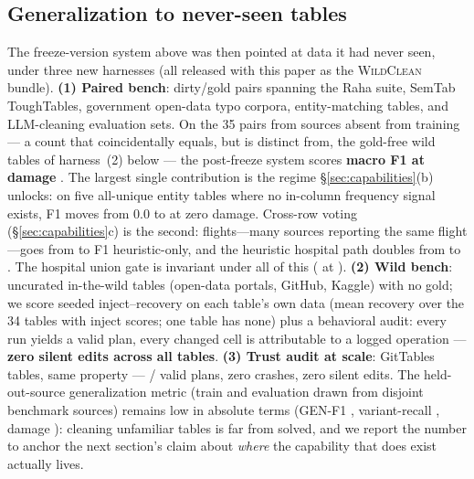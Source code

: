 \documentclass[11pt]{article}
\begin{document}
\subsection{Generalization to never-seen tables}
\label{sec:wild}
The freeze-version system above was then pointed at data it had never seen, under
three new harnesses (all released with this paper as the \textsc{WildClean} bundle).
\textbf{(1) Paired bench}: \nPairs{} dirty/gold pairs spanning the Raha suite, SemTab
ToughTables, government open-data typo corpora, entity-matching tables, and
LLM-cleaning evaluation sets. On the 35 pairs from sources absent from training ---
a count that coincidentally equals, but is distinct from, the \nWild{} gold-free wild
tables of harness~(2) below --- the
post-freeze system scores \textbf{macro F1 \unseenMacroF{} at damage
\unseenMacroDamage}. The largest single contribution is the regime
\S\ref{sec:capabilities}(b) unlocks: on five all-unique entity tables where no
in-column frequency signal exists, F1 moves from $0.0$ to \ttFOne{} at zero damage.
Cross-row voting (\S\ref{sec:capabilities}c) is the second: flights---many sources
reporting the same flight---goes from \flightsBaseF{} to \flightsVoteF{} F1
heuristic-only, and the heuristic hospital path doubles from \hospBaseHeur{} to
\hospVoteHeur{}. The hospital union gate is invariant under all of this
(\unionGatePrec{} at \unionGateCov). \textbf{(2) Wild bench}: \nWild{} uncurated
in-the-wild tables (open-data portals, GitHub, Kaggle) with no gold; we score seeded
inject--recovery on each table's own data (mean recovery \wildRecovery{} over the 34
tables with inject scores; one table has none) plus a
behavioral audit: every run yields a valid plan, every changed cell is attributable
to a logged operation --- \textbf{zero silent edits across all \nWild{} tables}.
\textbf{(3) Trust audit at scale}: \nTrust{} GitTables tables, same property ---
\nTrust{}/\nTrust{} valid plans, zero crashes, zero silent edits. The held-out-source
generalization metric (train and evaluation drawn from disjoint benchmark sources)
remains low in absolute terms (GEN-F1 \genFTwo{}, variant-recall \genVRTwo{}, damage
\genDamageTwo): cleaning unfamiliar tables is far from solved, and we report the
number to anchor the next section's claim about \emph{where} the capability that does
exist actually lives.
\end{document}
